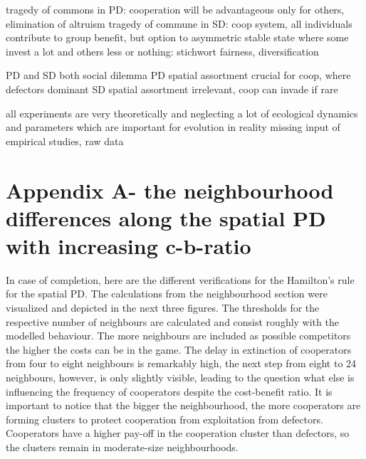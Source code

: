 \documentclass[DIV=calc, paper=a4, fontsize=11pt, twocolumn]{scrartcl}	 %
\begin{document}
tragedy of commons in PD: cooperation will be advantageous only for others, elimination of altruism 
tragedy of commune in SD: coop system, all individuals contribute to group benefit, but option to asymmetric stable state where some invest a lot and others less or nothing: stichwort fairness, diversification

PD and SD both social dilemma
PD spatial assortment crucial for coop, where defectors dominant
SD spatial assortment irrelevant, coop can invade if rare

all experiments are very theoretically and neglecting a lot of ecological dynamics and parameters which are important for evolution in reality
missing input of empirical studies, raw data

\section*{Appendix A- the neighbourhood differences along the spatial PD with increasing c-b-ratio}

In case of completion, here are the different verifications for the Hamilton's rule for the spatial PD. The calculations from the neighbourhood section were visualized and depicted in the next three figures. The thresholds for the respective number of neighbours are calculated and consist roughly with the modelled behaviour. The more neighbours are included as possible competitors the higher the costs can be in the game. The delay in extinction of cooperators from four to eight neighbours is remarkably high, the next step from eight to 24 neighbours, however, is only slightly visible, leading to the question what else is influencing the frequency of cooperators despite the cost-benefit ratio. It is important to notice that the bigger the neighbourhood, the more cooperators are forming clusters to protect cooperation from exploitation from defectors. Cooperators have a higher pay-off in the cooperation cluster than defectors, so the clusters remain in moderate-size neighbourhoods. 
\end{document}
